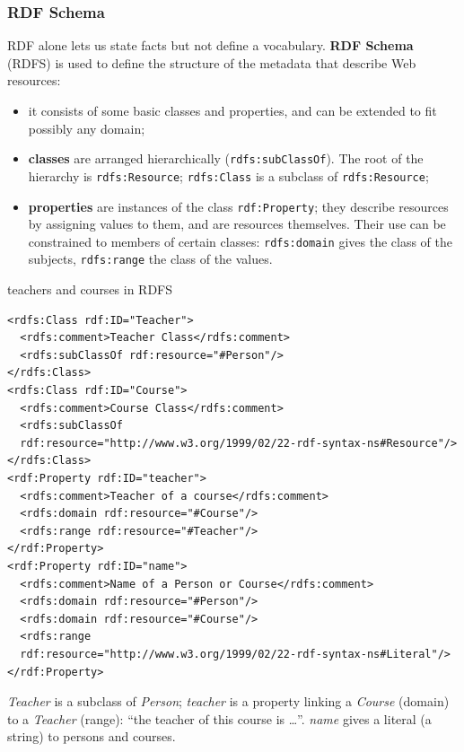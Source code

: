 \subsubsection{RDF Schema}

RDF alone lets us state facts but not define a vocabulary. \textbf{RDF Schema} (RDFS) is
used to define the structure of the metadata that describe Web resources:
\begin{itemize}[nosep]
  \item it consists of some basic classes and properties, and can be extended to fit
        possibly any domain;
  \item \textbf{classes} are arranged hierarchically (\texttt{rdfs:subClassOf}). The
        root of the hierarchy is \texttt{rdfs:Resource}; \texttt{rdfs:Class} is a
        subclass of \texttt{rdfs:Resource};
  \item \textbf{properties} are instances of the class \texttt{rdf:Property}; they
        describe resources by assigning values to them, and are resources themselves.
        Their use can be constrained to members of certain classes:
        \texttt{rdfs:domain} gives the class of the subjects, \texttt{rdfs:range} the
        class of the values.
\end{itemize}

\begin{nbexample}{teachers and courses in RDFS}
\begin{verbatim}
<rdfs:Class rdf:ID="Teacher">
  <rdfs:comment>Teacher Class</rdfs:comment>
  <rdfs:subClassOf rdf:resource="#Person"/>
</rdfs:Class>
<rdfs:Class rdf:ID="Course">
  <rdfs:comment>Course Class</rdfs:comment>
  <rdfs:subClassOf
  rdf:resource="http://www.w3.org/1999/02/22-rdf-syntax-ns#Resource"/>
</rdfs:Class>
<rdf:Property rdf:ID="teacher">
  <rdfs:comment>Teacher of a course</rdfs:comment>
  <rdfs:domain rdf:resource="#Course"/>
  <rdfs:range rdf:resource="#Teacher"/>
</rdf:Property>
<rdf:Property rdf:ID="name">
  <rdfs:comment>Name of a Person or Course</rdfs:comment>
  <rdfs:domain rdf:resource="#Person"/>
  <rdfs:domain rdf:resource="#Course"/>
  <rdfs:range
  rdf:resource="http://www.w3.org/1999/02/22-rdf-syntax-ns#Literal"/>
</rdf:Property>
\end{verbatim}
\emph{Teacher} is a subclass of \emph{Person}; \emph{teacher} is a property linking a
\emph{Course} (domain) to a \emph{Teacher} (range): ``the teacher of this course is
\ldots''. \emph{name} gives a literal (a string) to persons and courses.
\end{nbexample}

